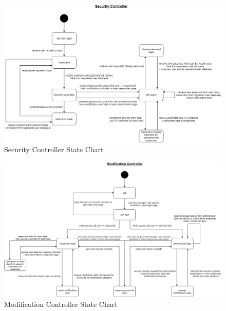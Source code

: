\documentclass[]{article}
\begin{document}
\begin{figure}[!hb]
      \includegraphics[width=\linewidth]{SecurityController.png}
      \caption{Security Controller State Chart}
      \label{fig:SCState}
\end{figure}

\begin{figure}[!hb]
      \includegraphics[width=\linewidth]{ModificationController.png}
      \caption{Modification Controller State Chart}
      \label{fig:MCState}
\end{figure}
    
\clearpage
\end{document}
